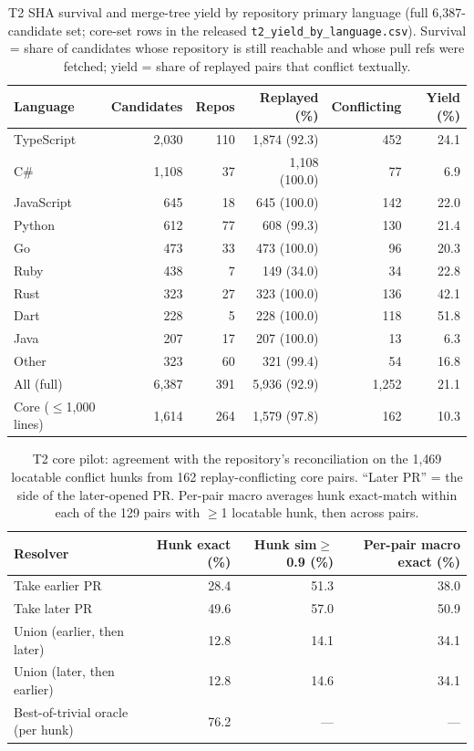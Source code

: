 \documentclass{article}
\begin{document}
\begin{table}[t]
\centering\small
\caption{T2 SHA survival and merge-tree yield by repository primary language (full 6{,}387-candidate set; core-set rows in the released \texttt{t2\_yield\_by\_language.csv}). Survival = share of candidates whose repository is still reachable and whose pull refs were fetched; yield = share of replayed pairs that conflict textually.}
\label{tab:t2yield}
\begin{tabular}{lrrrrr}
\toprule
Language & Candidates & Repos & Replayed (\%) & Conflicting & Yield (\%) \\
\midrule
TypeScript & 2{,}030 & 110 & 1{,}874 (92.3) & 452 & 24.1 \\
C\#        & 1{,}108 & 37  & 1{,}108 (100.0) & 77 & 6.9 \\
JavaScript & 645 & 18 & 645 (100.0) & 142 & 22.0 \\
Python     & 612 & 77 & 608 (99.3) & 130 & 21.4 \\
Go         & 473 & 33 & 473 (100.0) & 96 & 20.3 \\
Ruby       & 438 & 7  & 149 (34.0) & 34 & 22.8 \\
Rust       & 323 & 27 & 323 (100.0) & 136 & 42.1 \\
Dart       & 228 & 5  & 228 (100.0) & 118 & 51.8 \\
Java       & 207 & 17 & 207 (100.0) & 13 & 6.3 \\
Other      & 323 & 60 & 321 (99.4) & 54 & 16.8 \\
\midrule
All (full) & 6{,}387 & 391 & 5{,}936 (92.9) & 1{,}252 & 21.1 \\
Core ($\leq$1{,}000 lines) & 1{,}614 & 264 & 1{,}579 (97.8) & 162 & 10.3 \\
\bottomrule
\end{tabular}
\end{table}

\begin{table}[t]
\centering\small
\caption{T2 core pilot: agreement with the repository's reconciliation on the 1{,}469 locatable conflict hunks from 162 replay-conflicting core pairs. ``Later PR'' = the side of the later-opened PR. Per-pair macro averages hunk exact-match within each of the 129 pairs with $\geq$1 locatable hunk, then across pairs.}
\label{tab:t2pilot}
\begin{tabular}{lrrr}
\toprule
Resolver & Hunk exact (\%) & Hunk sim$\geq$0.9 (\%) & Per-pair macro exact (\%) \\
\midrule
Take earlier PR & 28.4 & 51.3 & 38.0 \\
Take later PR & 49.6 & 57.0 & 50.9 \\
Union (earlier, then later) & 12.8 & 14.1 & 34.1 \\
Union (later, then earlier) & 12.8 & 14.6 & 34.1 \\
Best-of-trivial oracle (per hunk) & 76.2 & --- & --- \\
\bottomrule
\end{tabular}
\end{table}
\end{document}

